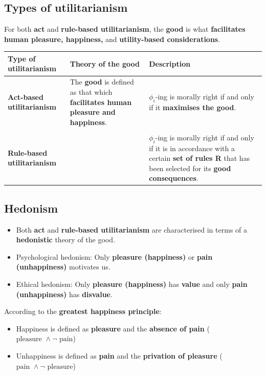 \documentclass[11pt]{article}
\begin{document}
\subsection{Types of utilitarianism}
\label{sec:org42fe08e}
For both \textbf{act} and \textbf{rule-based utilitarianism}, the \textbf{good} is what \textbf{facilitates human pleasure, happiness,} and \textbf{utility-based considerations}.
\begin{center}
\begin{tabularx}{\textwidth}{|X|X|X|}
\hline
Type of utilitarianism & Theory of the good & Description\\
\hline
\textbf{Act-based utilitarianism} & The \textbf{good} is defined as that which \textbf{facilitates human pleasure and happiness}. & \(\phi_i\)-ing is morally right if and only if it \textbf{maximises the good}.\\
 &  & \\
\textbf{Rule-based utilitarianism} &  & \(\phi_i\)-ing is morally right if and only if it is in accordance with a certain \textbf{set of rules R} that has been selected for its \textbf{good consequences}.\\
\hline
\end{tabularx}
\end{center}
\subsection{Hedonism}
\label{sec:org6821e99}
\begin{itemize}
\item Both \textbf{act} and \textbf{rule-based utilitarianism} are characterised in terms of a \textbf{hedonistic} theory of the good.
\item Psychological hedonism: Only \textbf{pleasure (happiness)} or \textbf{pain (unhappiness)} motivates us.
\item Ethical hedonism: Only \textbf{pleasure (happiness)} has \textbf{value} and only \textbf{pain (unhappiness)} has \textbf{disvalue}.
\end{itemize}

According to the \textbf{greatest happiness principle}:
\begin{itemize}
\item Happiness is defined as \textbf{pleasure} and the \textbf{absence of pain} (\(\text{pleasure } \wedge \neg \text{ pain}\))
\item Unhappiness is defined as \textbf{pain} and the \textbf{privation of pleasure} (\(\text{pain } \wedge \neg \text{ pleasure}\))
\end{itemize}
\end{document}

